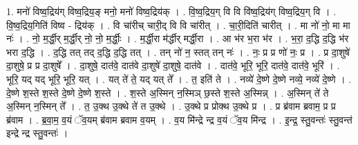 \documentclass[17pt]{extarticle}
\begin{document}
1. मनो॑ विष्व॒द्रिय॑ग् विष्व॒द्रिय॒ङ् मनो॒ मनो॑ विष्व॒द्रिय॑क् । . वि॒ष्व॒द्रिय॒ग् वि वि वि॑ष्व॒द्रिय॑ग् विष्व॒द्रिय॒ग् वि । . वि॒ष्व॒द्रिय॒गिति॑ विष्व - द्रिय॑क् । . वि चा॑रीच् चारी॒द् वि वि चा॑रीत् । . चा॒री॒दिति॑ चारीत् । . मा नो॑ नो॒ मा मा नः॑ । . नो॒ म॒र्द्धी॒र् म॒र्द्धी॒र् नो॒ नो॒ म॒र्द्धीः॒ । . म॒र्द्धी॒रा म॑र्द्धीर् मर्द्धी॒रा । . आ भ॑र भ॒रा भ॑र । . भ॒रा॒ द॒द्धि द॒द्धि भ॑र भरा द॒द्धि । . द॒द्धि तत् तद् द॒द्धि द॒द्धि तत् । . तन् नो॑ न॒ स्तत् तन् नः॑ । . नः॒ प्र प्र णो॑ नः॒ प्र । . प्र दा॒शुषे॑ दा॒शुषे॒ प्र प्र दा॒शुषे᳚ । . दा॒शुषे॒ दात॑वे॒ दात॑वे दा॒शुषे॑ दा॒शुषे॒ दात॑वे । . दात॑वे॒ भूरि॒ भूरि॒ दात॑वे॒ दात॑वे॒ भूरि॑ । . भूरि॒ यद् यद् भूरि॒ भूरि॒ यत् । . यत् ते॑ ते॒ यद् यत् ते᳚ । . त॒ इति॑ ते । . नव्ये॑ दे॒ष्णे दे॒ष्णे नव्ये॒ नव्ये॑ दे॒ष्णे । . दे॒ष्णे श॒स्ते श॒स्ते दे॒ष्णे दे॒ष्णे श॒स्ते । . श॒स्ते अ॒स्मिन् न॒स्मिञ् छ॒स्ते श॒स्ते अ॒स्मिन्न् । . अ॒स्मिन् ते॑ ते अ॒स्मिन् न॒स्मिन् ते᳚ । . त॒ उ॒क्थ उ॒क्थे ते॑ त उ॒क्थे । . उ॒क्थे प्र प्रोक्थ उ॒क्थे प्र । . प्र ब्र॑वाम ब्रवाम॒ प्र प्र ब्र॑वाम । . ब्र॒वा॒म॒ व॒यं ॅव॒यम् ब्र॑वाम ब्रवाम व॒यम् । . व॒य मि॑न्द्रे न्द्र व॒यं ॅव॒य मि॑न्द्र । . इ॒न्द्र॒ स्तु॒वन्तः॑ स्तु॒वन्त॑ इन्द्रे न्द्र स्तु॒वन्तः॑ । \newline
\end{document}
